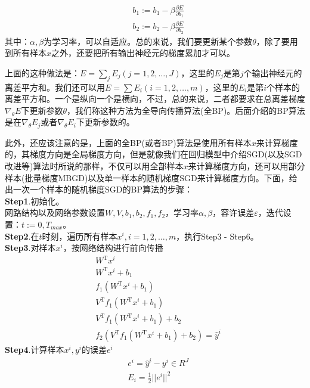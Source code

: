 {\begin{align*}
            & b_1:=b_1 -\beta \frac{\partial E}{\partial b_1}\\
            & b_2:=b_2 - \beta \frac{\partial E}{\partial b_2}
            \end{align*}
            其中：$\alpha,\beta$为学习率，可以自适应。总的来说，我们要更新某个参数$\theta$，除了要用到所有样本$x$之外，还要把所有输出神经元的梯度累加才可以。
            \par
            上面的这种做法是：$E = \sum_j E_j(j = 1,2,\dots,J)$，这里的$E_j$是第$j$个输出神经元的离差平方和。我们还可以用$E = \sum E_i(i = 1,2,\dots,m)$，这里的$E_i$是第$i$个样本的离差平方和。一个是纵向一个是横向，不过，总的来说，二者都要求在总离差梯度$\nabla_\theta E$下更新参数$\theta$，我们称这种方法为全导向传播算法(全BP)。后面介绍的BP算法是在$\nabla_\theta E_j$或者$\nabla_\theta E_i$下更新参数的。
            \par
            此外，还应该注意的是，上面的全BP(或者BP)算法是使用所有样本$x$来计算梯度的，其梯度方向是全局梯度方向，但是就像我们在回归模型中介绍SGD(以及SGD改进等)算法时所说的那样，不仅可以用全部样本$x$来计算梯度方向，还可以用部分样本(批量梯度MBGD)以及单一样本的随机梯度SGD来计算梯度方向。下面，给出一次一个样本的随机梯度SGD的BP算法的步骤：\\
            \textbf{Step1}.初始化。\\
            网路结构以及网络参数设置$W,V,b_1,b_2,f_1,f_2$，学习率$\alpha,\beta$，容许误差$\varepsilon$，迭代设置：$t:=0,T_{max}$。\\
            \textbf{Step2}.在$t$时刻，遍历所有样本$x^i,i=1,2,\dots,m$，执行Step3 - Step6。\\
            \textbf{Step3}.对样本$x^i$，按网络结构进行前向传播
            \begin{align*}
            & W^\mathrm{T}x^i\\
            & W^\mathrm{T}x^i+b_1\\
            & f_1(W^\mathrm{T}x^i+b_1)\\
            & V^\mathrm{T}f_1(W^\mathrm{T}x^i+b_1)\\
            & V^\mathrm{T}f_1(W^\mathrm{T}x^i+b_1)+b_2\\
            & f_2(V^\mathrm{T}f_1(W^\mathrm{T}x^i+b_1)+b_2) = \hat{y}^i
            \end{align*}
            \textbf{Step4}.计算样本$x^i,y^i$的误差$e^i$
            \begin{align*}
            &e^i = \hat{y}^i - y^i \in R^J\\
            &E_i = \frac{1}{2} ||e^i||^2

\end{align*}}
